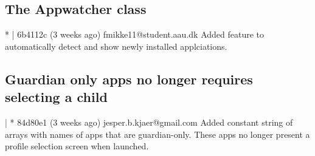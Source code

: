 \subsection{The Appwatcher class}
* | 6b4112c (3 weeks ago) fmikke11@student.aau.dk Added feature to automatically detect and show newly installed applciations.

\subsection{Guardian only apps no longer requires selecting a child}
| * 84d80e1 (3 weeks ago) jesper.b.kjaer@gmail.com Added constant string of arrays with names of apps that are guardian-only. These apps no longer present a profile selection screen when launched.\\